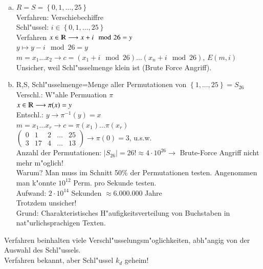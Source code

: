 \begin{enumerate}[a)]
	\item $R=S=\left\{0,1,\ldots,25\right\}$\\
	Verfahren: Verschiebechiffre\\
	Schl"ussel: $i \in \left\{0,1,\ldots,25\right\}$\\
	Verfahren $ x \in \R \longrightarrow x+i \mod{26}=y$\\
	$y\longmapsto y-i \mod{26} = y$\\
	$m=x_1 ... x_2 \longrightarrow  c = (x_1 + i \mod{26}) \textbf{}\ldots (x_n +i \mod{26})$, $E(m,i)$\\
	Unsicher, weil Schl"usselmenge klein ist (Brute Force Angriff).
	\item R,S, Schl"usselmenge=Menge aller Permutationen von $\left\{1,\ldots,25\right\}=S_{26}$\\
	Verschl.: W"ahle Permuation $\pi$\\
	$x \in \R \longrightarrow \pi (x)=y$\\
	Entschl.: $y \longrightarrow \pi^{-1}(y)=x$\\
	$m=x_1 \ldots x_r \rightarrow c=\pi(x_1)\ldots\pi(x_r)$\\
	$\begin{pmatrix}
  0 & 1 & 2 & \ldots & 25 \\
  3 & 17 & 4 & \ldots & 13
	\end{pmatrix}
	\longrightarrow \pi(0)=3$, u.s.w.\\
	Anzahl der Permutationen: $\left|{S_{26}}\right|=26!\approx4\cdot10^{26} \longrightarrow$ Brute-Force Angriff nicht mehr m"oglich! \\
	Warum? Man muss im Schnitt 50\% der Permutationen testen. Angenommen man k"onnte $10^12$ Perm. pro Sekunde testen.\\
	Aufwand: $2\cdot10^{14}$ Sekunden $\approx 6.000.000$ Jahre\\
	Trotzdem unsicher!\\
	Grund: Charakteristisches H"aufigkeitsverteilung von Buchstaben in nat"urlichsprachigen Texten.
\end{enumerate}
Verfahren beinhalten viele Verschl"usselungsm"oglichkeiten, abh"angig von der Auswahl des Schl"ussels.\\
Verfahren bekannt, aber Schl"ussel $k_d$ geheim!\\
